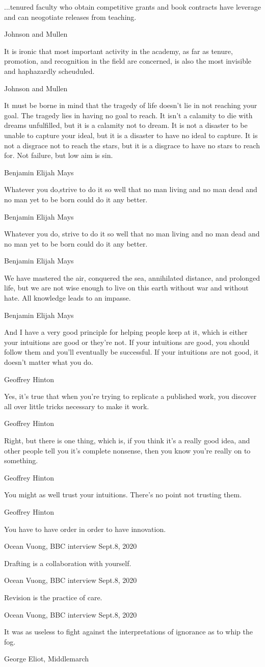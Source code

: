 \epigraph{...tenured faculty who obtain competitive grants and book contracts have leverage and can neogotiate releases from teaching.}{Johnson and Mullen \cite{Johnson2007WriteToTheTopHowToBecomeAProlificAcademic}}
\epigraph{It is ironic that most important activity in the academy, as far as tenure, promotion, and recognition in the field are concerned, is also the most invisible and haphazardly scheuduled.}{Johnson and Mullen \cite{Johnson2007WriteToTheTopHowToBecomeAProlificAcademic}}
\epigraph{It must be borne in mind that the tragedy of life doesn’t lie in not reaching your goal. The tragedy lies in having no goal to reach. It isn’t a calamity to die with dreams unfulfilled, but it is a calamity not to dream. It is not a disaster to be unable to capture your ideal, but it is a disaster to have no ideal to capture. It is not a disgrace not to reach the stars, but it is a disgrace to have no stars to reach for. Not failure, but low aim is sin.}{Benjamin Elijah Mays}
\epigraph{Whatever you do,strive to do it so well that no man living and no man dead and no man yet to be born could do it any better.}{Benjamin Elijah Mays}
\epigraph{Whatever you do, strive to do it so well that no man living and no man dead and no man yet to be born could do it any better.}{Benjamin Elijah Mays}
\epigraph{We have mastered the air, conquered the sea, annihilated distance, and prolonged life, but we are not wise enough to live on this earth without war and without hate. All knowledge leads to an impasse.}{Benjamin Elijah Mays}
\epigraph{And I have a very good principle for helping people keep at it, which is either your intuitions are good or they're not. If your intuitions are good, you should follow them and you'll eventually be successful. If your intuitions are not good, it doesn't matter what you do.}{Geoffrey Hinton}
\epigraph{Yes, it's true that when you're trying to replicate a published work, you discover all over little tricks necessary to make it work.}{Geoffrey Hinton}
\epigraph{Right, but there is one thing, which is, if you think it's a really good idea, and other people tell you it's complete nonsense, then you know you're really on to something.}{Geoffrey Hinton}
\epigraph{You might as well trust your intuitions. There's no point not trusting them.}{Geoffrey Hinton}
\epigraph{You have to have order in order to have innovation.}{Ocean Vuong, BBC interview Sept.8, 2020}
\epigraph{Drafting is a collaboration with yourself.}{Ocean Vuong, BBC interview Sept.8, 2020}
\epigraph{Revision is the practice of care. }{Ocean Vuong, BBC interview Sept.8, 2020}
\epigraph{It was as useless to fight against the interpretations of ignorance as to whip the fog.}{George Eliot, Middlemarch}
